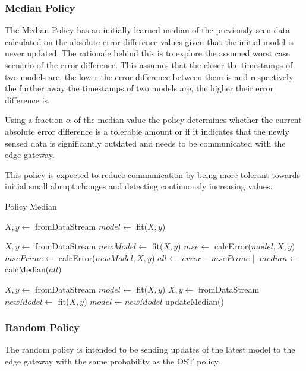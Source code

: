 \documentclass{mpaper}
\begin{document}
\subsubsection{Median Policy}

The Median Policy has an initially learned median of the previously seen data calculated on the absolute error difference values given that the initial model is never updated. 
The rationale behind this is to explore the assumed worst case scenario of the error difference. This assumes that the closer the timestamps of two models are, the lower the error difference between them is and respectively, the further away the timestamps of two models are, the higher their error difference is.

Using a fraction $\alpha$ of the median value the policy determines whether the current absolute error difference is a tolerable amount or if it indicates that the newly sensed data is significantly outdated and needs to be communicated with the edge gateway.

This policy is expected to reduce communication by being more tolerant towards initial small abrupt changes and detecting continuously increasing values.

\begin{algorithm}[h]
\caption{Policy Median}\label{polM}
\begin{algorithmic}
    \State $X, y \gets$ fromDataStream
    \State $model \gets$ fit($X,y$)
    
        \State $X, y \gets$ fromDataStream
        \State $newModel \gets$ fit($X,y$)
        \State $mse \gets$ calcError($model,X,y$)
        \State $msePrime \gets$ calcError($newModel,X,y$)
        \State $all \gets \mid error - msePrime \mid$
    \EndFor
    \State $median \gets$ calcMedian($all$)
\EndProcedure

\State $X, y \gets$ fromDataStream
\State $model \gets$ fit($X,y$)
    \State $X, y \gets$ fromDataStream
    \State $newModel \gets$ fit($X,y$)
        \State $model \gets newModel$ 
    \EndIf
        \State updateMedian()
    \EndIf
\EndWhile
\end{algorithmic}
\end{algorithm}

\subsubsection{Random Policy}
The random policy is intended to be sending updates of the latest model to the edge gateway with the same probability as the OST policy.
\end{document}
